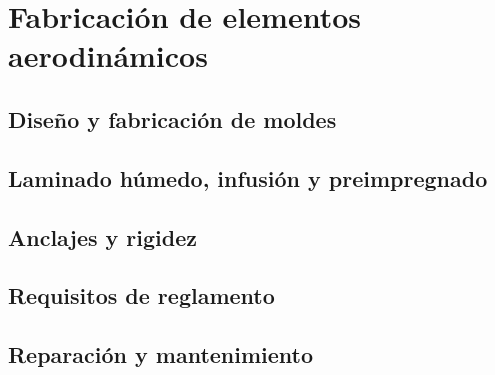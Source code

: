 \chapter{Fabricación de elementos aerodinámicos}
\label{ch:fabricacion_aero}

\begin{objetivos}
  \item {}
  \item {}
  \item {}
\end{objetivos}


\section{Diseño y fabricación de moldes}
\label{sec:fabricacion_aero:01}

\section{Laminado húmedo, infusión y preimpregnado}
\label{sec:fabricacion_aero:02}

\section{Anclajes y rigidez}
\label{sec:fabricacion_aero:03}

\section{Requisitos de reglamento}
\label{sec:fabricacion_aero:04}

\section{Reparación y mantenimiento}
\label{sec:fabricacion_aero:05}


